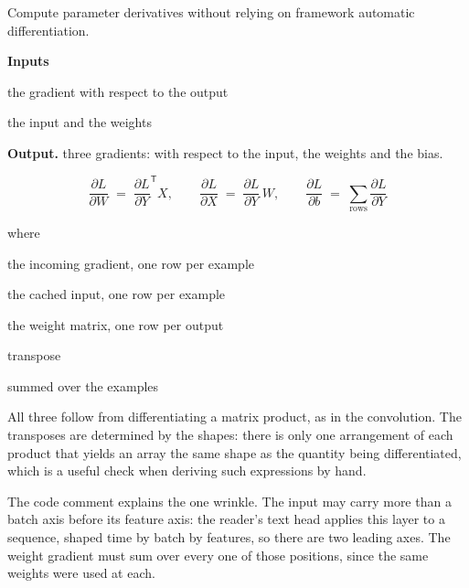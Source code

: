 Compute parameter derivatives without relying on framework automatic differentiation.




\noindent\textbf{Inputs}
\begin{description}[leftmargin=2.2em,style=nextline,font=\normalfont\ttfamily]\setlength\itemsep{1pt}
  \item[{dout}] \normalfont the gradient with respect to the output
  \item[{cache}] \normalfont the input and the weights
\end{description}

\noindent\textbf{Output.} three gradients: with respect to the input, the weights and the bias.



\begin{equation}
\frac{\partial L}{\partial W} \;=\; \frac{\partial L}{\partial Y}^{\mathsf{T}} X, \qquad \frac{\partial L}{\partial X} \;=\; \frac{\partial L}{\partial Y} \, W, \qquad \frac{\partial L}{\partial b} \;=\; \sum_{\text{rows}} \frac{\partial L}{\partial Y}
\end{equation}

\noindent where
\begin{description}[leftmargin=2.4em,style=nextline,font=\normalfont\ttfamily]\setlength\itemsep{1pt}
  \item[{$\frac{\partial L}{\partial Y}$}] \normalfont the incoming gradient, one row per example
  \item[{$X$}] \normalfont the cached input, one row per example
  \item[{$W$}] \normalfont the weight matrix, one row per output
  \item[{${}^{\mathsf{T}}$}] \normalfont transpose
  \item[{$\sum_{\text{rows}}$}] \normalfont summed over the examples
\end{description}
All three follow from differentiating a matrix product, as in the convolution. The transposes are determined by the shapes: there is only one arrangement of each product that yields an array the same shape as the quantity being differentiated, which is a useful check when deriving such expressions by hand.


The code comment explains the one wrinkle. The input may carry more than a batch axis before its feature axis: the reader's text head applies this layer to a sequence, shaped time by batch by features, so there are two leading axes. The weight gradient must sum over every one of those positions, since the same weights were used at each.


